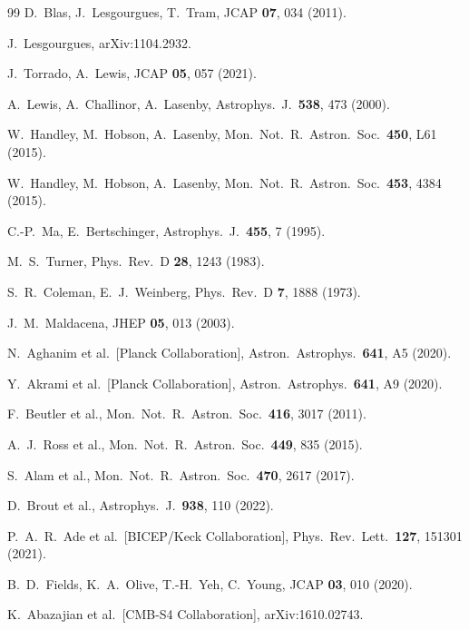\documentclass[epj]{svjour}
\begin{document}
\begin{thebibliography}{99}
D.~Blas, J.~Lesgourgues, T.~Tram,
JCAP \textbf{07}, 034 (2011).

J.~Lesgourgues,
arXiv:1104.2932.

J.~Torrado, A.~Lewis,
JCAP \textbf{05}, 057 (2021).

A.~Lewis, A.~Challinor, A.~Lasenby,
Astrophys.\ J.\ \textbf{538}, 473 (2000).

W.~Handley, M.~Hobson, A.~Lasenby,
Mon.\ Not.\ R.\ Astron.\ Soc.\ \textbf{450}, L61 (2015).

W.~Handley, M.~Hobson, A.~Lasenby,
Mon.\ Not.\ R.\ Astron.\ Soc.\ \textbf{453}, 4384 (2015).

C.-P.~Ma, E.~Bertschinger,
Astrophys.\ J.\ \textbf{455}, 7 (1995).

M.~S.~Turner,
Phys.\ Rev.\ D \textbf{28}, 1243 (1983).

S.~R.~Coleman, E.~J.~Weinberg,
Phys.\ Rev.\ D \textbf{7}, 1888 (1973).

J.~M.~Maldacena,
JHEP \textbf{05}, 013 (2003).

N.~Aghanim et al.\ [Planck Collaboration],
Astron.\ Astrophys.\ \textbf{641}, A5 (2020).

Y.~Akrami et al.\ [Planck Collaboration],
Astron.\ Astrophys.\ \textbf{641}, A9 (2020).

F.~Beutler et al.,
Mon.\ Not.\ R.\ Astron.\ Soc.\ \textbf{416}, 3017 (2011).

A.~J.~Ross et al.,
Mon.\ Not.\ R.\ Astron.\ Soc.\ \textbf{449}, 835 (2015).

S.~Alam et al.,
Mon.\ Not.\ R.\ Astron.\ Soc.\ \textbf{470}, 2617 (2017).

D.~Brout et al.,
Astrophys.\ J.\ \textbf{938}, 110 (2022).

P.~A.~R.~Ade et al.\ [BICEP/Keck Collaboration],
Phys.\ Rev.\ Lett.\ \textbf{127}, 151301 (2021).

B.~D.~Fields, K.~A.~Olive, T.-H.~Yeh, C.~Young,
JCAP \textbf{03}, 010 (2020).

K.~Abazajian et al.\ [CMB-S4 Collaboration],
arXiv:1610.02743.


\end{thebibliography}
\end{document}
